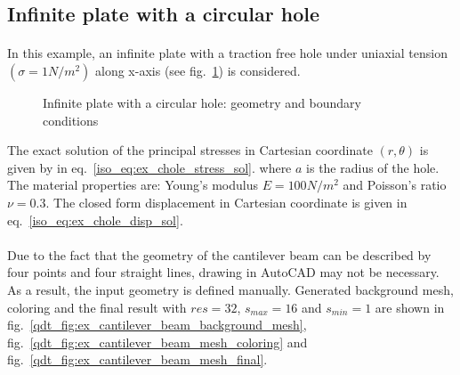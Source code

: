 \subsection{Infinite plate with a circular hole}
\paragraph{}
In this example, an infinite plate with a traction free hole under uniaxial tension $(\sigma = 1 N/m^2 )$
along x-axis (see fig.~\ref{qdt_fig:ex_chole_geo_bc}) is considered.

    \begin{figure}[h!]
        \centering
        \caption{ Infinite plate with a circular hole: geometry and boundary conditions}
        \label{qdt_fig:ex_chole_geo_bc}
    \end{figure}
    
The exact solution of the principal stresses in Cartesian coordinate $(r,\theta)$ is given by \cite{Sukumar2001} in eq.~\ref{iso_eq:ex_chole_stress_sol}.
where $a$ is the radius of the hole.
The material properties are: Young’s modulus $E = 100 N/m^2$ and Poisson’s ratio $\nu = 0.3$.
The closed form displacement in Cartesian coordinate is given in eq.~\ref{iso_eq:ex_chole_disp_sol}.

\paragraph{}
Due to the fact that the geometry of the cantilever beam can be described by four points and four straight lines, drawing in AutoCAD may not be necessary.
As a result, the input geometry is defined manually.
Generated background mesh, coloring and the final result with $res=32$, $s_{max}=16$ and $s_{min}=1$ are shown in fig.~\ref{qdt_fig:ex_cantilever_beam_background_mesh}, fig.~\ref{qdt_fig:ex_cantilever_beam_mesh_coloring} and fig.~\ref{qdt_fig:ex_cantilever_beam_mesh_final}.



